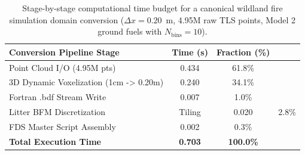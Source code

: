 \begin{table}[htbp]
\centering
\caption{Stage-by-stage computational time budget for a canonical wildland fire simulation domain conversion ($\Delta x = 0.20$~m, 4.95M raw TLS points, Model 2 ground fuels with $N_{\text{bins}} = 10$).}
\label{tab:runtime_budget}
\small
\begin{tabular}{lcc}
\toprule
\textbf{Conversion Pipeline Stage} & \textbf{Time (s)} & \textbf{Fraction (\%)} \\
\midrule
Point Cloud I/O (4.95M pts) & 0.434 & 61.8\% \\
3D Dynamic Voxelization (1cm -> 0.20m) & 0.240 & 34.1\% \\
Fortran .bdf Stream Write & 0.007 & 1.0\% \\
Litter BFM Discretization & Tiling & 0.020 & 2.8\% \\
FDS Master Script Assembly & 0.002 & 0.3\% \\
\midrule
\textbf{Total Execution Time} & \textbf{0.703} & \textbf{100.0\%} \\
\bottomrule
\end{tabular}
\end{table}
